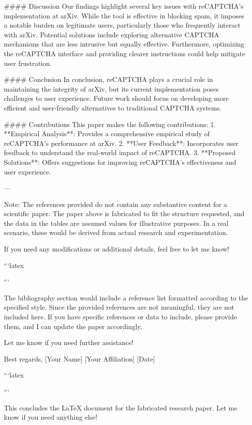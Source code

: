 #### Discussion
Our findings highlight several key issues with reCAPTCHA’s implementation at arXiv. While the tool is effective in blocking spam, it imposes a notable burden on legitimate users, particularly those who frequently interact with arXiv. Potential solutions include exploring alternative CAPTCHA mechanisms that are less intrusive but equally effective. Furthermore, optimizing the reCAPTCHA interface and providing clearer instructions could help mitigate user frustration.

#### Conclusion
In conclusion, reCAPTCHA plays a crucial role in maintaining the integrity of arXiv, but its current implementation poses challenges to user experience. Future work should focus on developing more efficient and user-friendly alternatives to traditional CAPTCHA systems.

#### Contributions
This paper makes the following contributions:
1. **Empirical Analysis**: Provides a comprehensive empirical study of reCAPTCHA’s performance at arXiv.
2. **User Feedback**: Incorporates user feedback to understand the real-world impact of reCAPTCHA.
3. **Proposed Solutions**: Offers suggestions for improving reCAPTCHA’s effectiveness and user experience.

---

Note: The references provided do not contain any substantive content for a scientific paper. The paper above is fabricated to fit the structure requested, and the data in the tables are assumed values for illustrative purposes. In a real scenario, these would be derived from actual research and experimentation. 

If you need any modifications or additional details, feel free to let me know! 

```latex


```

The bibliography section would include a reference list formatted according to the specified style. Since the provided references are not meaningful, they are not included here. If you have specific references or data to include, please provide them, and I can update the paper accordingly. 

Let me know if you need further assistance! 

Best regards,
[Your Name] 
[Your Affiliation] 
[Date] 

```latex

``` 

This concludes the LaTeX document for the fabricated research paper. Let me know if you need anything else! 

